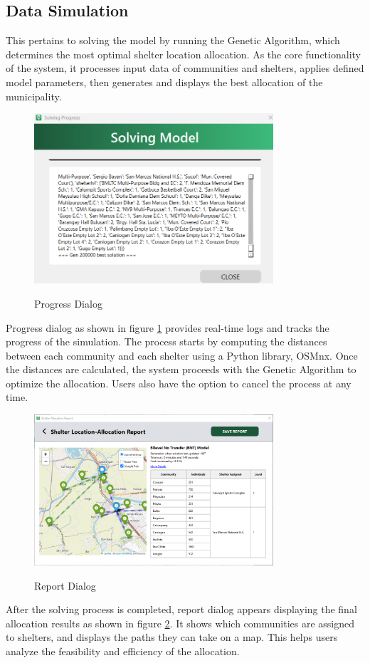 	
\subsection{Data Simulation}
	This pertains to solving the model by running the Genetic Algorithm, which determines the most optimal shelter location allocation. As the core functionality of the system, it processes input data of communities and shelters, applies defined model parameters, then generates and displays the best allocation of the municipality.
	
	\begin{figure}[h!]
		\caption{Progress Dialog}
		\centering
		\includegraphics[width=3.5in]{Chapter 4/progress}
		\label{solveProg}
	\end{figure}
	Progress dialog as shown in figure \ref{solveProg} provides real-time logs and tracks the progress of the simulation. The process starts by computing the distances between each community and each shelter using a Python library, OSMnx. Once the distances are calculated, the system proceeds with the Genetic Algorithm to optimize the allocation. Users also have the option to cancel the process at any time.
	
	\begin{figure}[h!]
		\caption{Report Dialog}
		\centering
		\includegraphics[width=3.5in]{Chapter 4/alloc report}
		\label{shelAllocRep}
	\end{figure}
	After the solving process is completed, report dialog appears displaying the final allocation results as shown in figure \ref{shelAllocRep}. It shows which communities are assigned to shelters, and displays the paths they can take on a map. This helps users analyze the feasibility and efficiency of the allocation.
	
